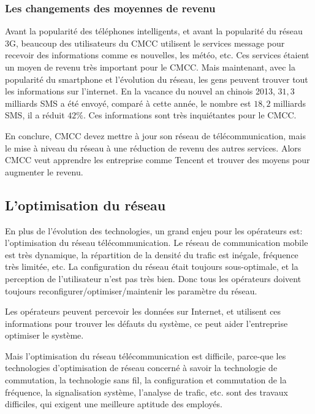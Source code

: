  \subsubsection{Les changements des moyennes de revenu}
Avant la popularité des téléphones intelligents, et avant la popularité du réseau 3G, beaucoup des utilisateurs du CMCC utilisent le services message pour recevoir des informations comme es nouvelles, les météo, etc. Ces services étaient un moyen de revenu très important pour le CMCC.  Mais maintenant, avec la popularité du smartphone et l'évolution du réseau, les gens peuvent trouver tout les informations sur l'internet. En la vacance du nouvel an chinois 2013, $31,3$ milliards SMS a été envoyé, comparé à cette année, le nombre est $18,2$ milliards SMS, il a réduit $42\%$. Ces informations sont très inquiétantes pour le CMCC.

En conclure, CMCC devez mettre à jour son réseau de télécommunication, mais le mise à niveau du réseau à une réduction de revenu des autres services. Alors CMCC veut apprendre les entreprise comme \textsf{Tencent} et trouver des moyens pour augmenter le revenu.
  \subsection{L'optimisation du réseau}
En plus de l'évolution des technologies, un grand enjeu pour les opérateurs est: l'optimisation du réseau télécommunication. Le réseau de communication mobile est très dynamique, la répartition de la densité du trafic est inégale, fréquence très limitée, etc. La configuration du réseau était toujours sous-optimale, et la perception de l'utilisateur n'est pas très bien. Donc tous les opérateurs doivent toujours reconfigurer/optimiser/maintenir les paramètre du réseau.
  
Les opérateurs peuvent percevoir les données sur Internet, et utilisent ces informations pour trouver les défauts du système, ce peut aider l'entreprise optimiser le système.

Mais l'optimisation du réseau télécommunication est difficile, parce-que les technologies d'optimisation de réseau concerné à savoir la technologie de commutation, la technologie sans fil, la configuration et commutation de la fréquence, la signalisation système, l'analyse de trafic, etc. sont des travaux difficiles, qui exigent une meilleure aptitude des employés.  

